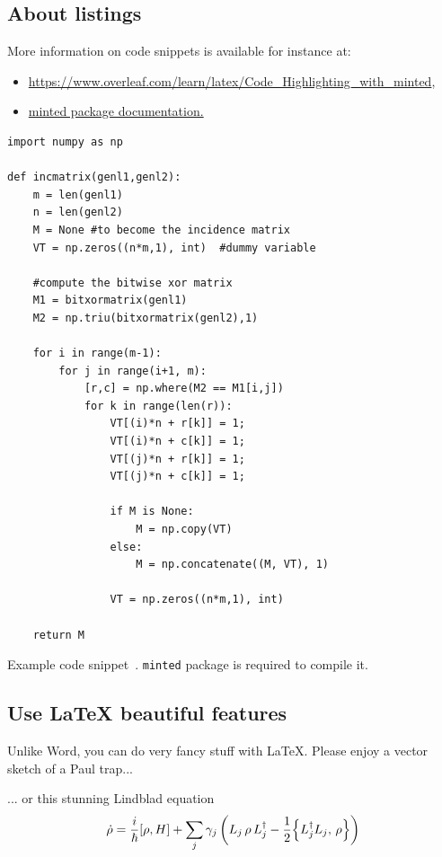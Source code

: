 \subsection{About listings}
More information on code snippets is available for instance at:
\begin{itemize}
    \item \url{https://www.overleaf.com/learn/latex/Code_Highlighting_with_minted},
    \item \href{https://repo.skni.umcs.pl/ctan/macros/latex/contrib/minted/minted.pdf}{minted package documentation.}
\end{itemize}


\begin{longlisting}
\begin{verbatim}
import numpy as np
    
def incmatrix(genl1,genl2):
    m = len(genl1)
    n = len(genl2)
    M = None #to become the incidence matrix
    VT = np.zeros((n*m,1), int)  #dummy variable
    
    #compute the bitwise xor matrix
    M1 = bitxormatrix(genl1)
    M2 = np.triu(bitxormatrix(genl2),1) 

    for i in range(m-1):
        for j in range(i+1, m):
            [r,c] = np.where(M2 == M1[i,j])
            for k in range(len(r)):
                VT[(i)*n + r[k]] = 1;
                VT[(i)*n + c[k]] = 1;
                VT[(j)*n + r[k]] = 1;
                VT[(j)*n + c[k]] = 1;
                
                if M is None:
                    M = np.copy(VT)
                else:
                    M = np.concatenate((M, VT), 1)
                
                VT = np.zeros((n*m,1), int)
    
    return M
\end{verbatim}
\caption{Example code snippet~\cite{code}. \texttt{minted} package is required to compile it.}
\label{code:example}
\end{longlisting}
\fi




\subsection{Use LaTeX beautiful features}


Unlike Word, you can do very fancy stuff with \LaTeX. Please enjoy a vector sketch of a Paul trap...

\begin{center}
\scalebox{1.2}{
    
}
\end{center}
... or this stunning Lindblad equation
\begin{equation}
    \dot{\rho} = \frac{i}{\hbar} [\rho,H] + \sum_j \gamma_j \left( L_j \, \rho \,  L_j^\dagger - \frac{1}{2} \Bigl\{ L_j^\dagger L_j, \, \rho \Bigr\} \right)
    \label{eq:Lindblad}
\end{equation}





